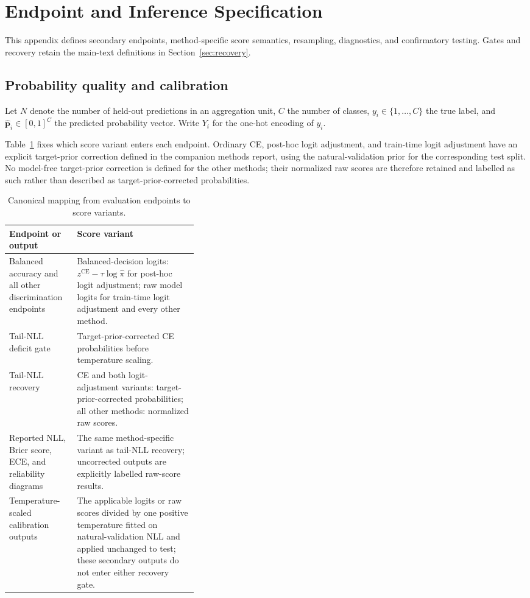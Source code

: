 \documentclass[11pt]{article}
\begin{document}
\section{Endpoint and Inference Specification}
\label{app:endpoints}
This appendix defines secondary endpoints, method-specific score semantics, resampling, diagnostics, and confirmatory testing. Gates and recovery retain the main-text definitions in Section~\ref{sec:recovery}.

\subsection{Probability quality and calibration}
Let $N$ denote the number of held-out predictions in an aggregation unit, $C$ the number of classes, $y_i\in\{1,\ldots,C\}$ the true label, and $\hat{\mathbf{p}}_i\in[0,1]^C$ the predicted probability vector. Write $Y_i$ for the one-hot encoding of $y_i$.

Table~\ref{tab:score-variants} fixes which score variant enters each endpoint. Ordinary CE,
post-hoc logit adjustment, and train-time logit adjustment have an explicit target-prior
correction defined in the companion methods report, using the natural-validation prior for the
corresponding test split. No model-free target-prior correction is defined for the other methods;
their normalized raw scores are therefore retained and labelled as such rather than described as
target-prior-corrected probabilities.

\begin{table}[ht]
  \centering
  \small
  \begin{tabularx}{\linewidth}{@{}p{0.36\linewidth}X@{}}
    \toprule
    Endpoint or output & Score variant \\
    \midrule
    Balanced accuracy and all other discrimination endpoints
      & Balanced-decision logits: $z^{\mathrm{CE}}-\tau\log\widehat\pi$ for post-hoc logit adjustment; raw model logits for train-time logit adjustment and every other method. \\
    Tail-NLL deficit gate
      & Target-prior-corrected CE probabilities before temperature scaling. \\
    Tail-NLL recovery
      & CE and both logit-adjustment variants: target-prior-corrected probabilities; all other methods: normalized raw scores. \\
    Reported NLL, Brier score, ECE, and reliability diagrams
      & The same method-specific variant as tail-NLL recovery; uncorrected outputs are explicitly labelled raw-score results. \\
    Temperature-scaled calibration outputs
      & The applicable logits or raw scores divided by one positive temperature fitted on natural-validation NLL and applied unchanged to test; these secondary outputs do not enter either recovery gate. \\
    \bottomrule
  \end{tabularx}
  \caption{Canonical mapping from evaluation endpoints to score variants.}
  \label{tab:score-variants}
\end{table}
\end{document}
